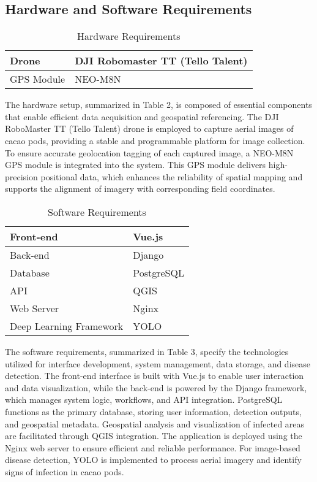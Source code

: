 	\subsection{Hardware and Software Requirements}
	
	\begin{table}[h!]
		\centering
		\caption{Hardware Requirements}
		\label{tab:hardreq}
		\begin{tabular}{ll}
			\toprule
			Drone & DJI Robomaster TT (Tello Talent) \\
			\midrule
			GPS Module & NEO-M8N \\
			\bottomrule
		\end{tabular}
	\end{table}
	
	The hardware setup, summarized in Table 2, is composed of essential components that enable efficient data acquisition and geospatial referencing. The DJI RoboMaster TT (Tello Talent) drone is employed to capture aerial images of cacao pods, providing a stable and programmable platform for image collection. To ensure accurate geolocation tagging of each captured image, a NEO-M8N GPS module is integrated into the system. This GPS module delivers high-precision positional data, which enhances the reliability of spatial mapping and supports the alignment of imagery with corresponding field coordinates.
	
	\begin{table}[h!]
		\centering
		\caption{Software Requirements}
		\label{tab:softreq}
		\begin{tabular}{ll}
			\toprule
			Front-end & Vue.js \\
			\midrule
			Back-end & Django \\
			\midrule
			Database & PostgreSQL \\
			\midrule
			API & QGIS \\
			\midrule
			Web Server & Nginx \\
			\midrule
			Deep Learning Framework & YOLO \\
			\bottomrule
		\end{tabular}
	\end{table}
	
	The software requirements, summarized in Table 3, specify the technologies utilized for interface development, system management, data storage, and disease detection. The front-end interface is built with Vue.js to enable user interaction and data visualization, while the back-end is powered by the Django framework, which manages system logic, workflows, and API integration. PostgreSQL functions as the primary database, storing user information, detection outputs, and geospatial metadata. Geospatial analysis and visualization of infected areas are facilitated through QGIS integration. The application is deployed using the Nginx web server to ensure efficient and reliable performance. For image-based disease detection, YOLO is implemented to process aerial imagery and identify signs of infection in cacao pods.
	
